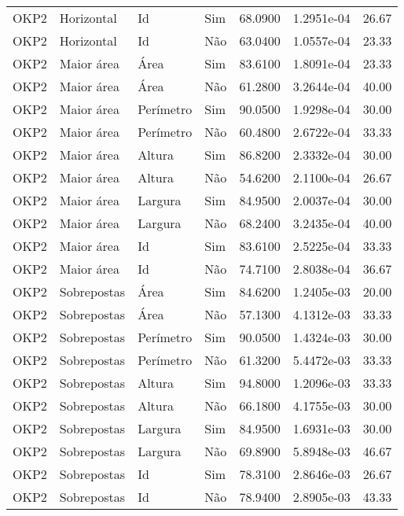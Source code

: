 \begin{tabular}{llllrrr}
    OKP2      & Horizontal  & Id        & Sim         & 68.0900      & 1.2951e-04 & 26.67    \\
    OKP2      & Horizontal  & Id        & Não         & 63.0400      & 1.0557e-04 & 23.33    \\
    OKP2      & Maior área  & Área      & Sim         & 83.6100      & 1.8091e-04 & 23.33    \\
    OKP2      & Maior área  & Área      & Não         & 61.2800      & 3.2644e-04 & 40.00    \\
    OKP2      & Maior área  & Perímetro & Sim         & 90.0500      & 1.9298e-04 & 30.00    \\
    OKP2      & Maior área  & Perímetro & Não         & 60.4800      & 2.6722e-04 & 33.33    \\
    OKP2      & Maior área  & Altura    & Sim         & 86.8200      & 2.3332e-04 & 30.00    \\
    OKP2      & Maior área  & Altura    & Não         & 54.6200      & 2.1100e-04 & 26.67    \\
    OKP2      & Maior área  & Largura   & Sim         & 84.9500      & 2.0037e-04 & 30.00    \\
    OKP2      & Maior área  & Largura   & Não         & 68.2400      & 3.2435e-04 & 40.00    \\
    OKP2      & Maior área  & Id        & Sim         & 83.6100      & 2.5225e-04 & 33.33    \\
    OKP2      & Maior área  & Id        & Não         & 74.7100      & 2.8038e-04 & 36.67    \\
    OKP2      & Sobrepostas & Área      & Sim         & 84.6200      & 1.2405e-03 & 20.00    \\
    OKP2      & Sobrepostas & Área      & Não         & 57.1300      & 4.1312e-03 & 33.33    \\
    OKP2      & Sobrepostas & Perímetro & Sim         & 90.0500      & 1.4324e-03 & 30.00    \\
    OKP2      & Sobrepostas & Perímetro & Não         & 61.3200      & 5.4472e-03 & 33.33    \\
    OKP2      & Sobrepostas & Altura    & Sim         & 94.8000      & 1.2096e-03 & 33.33    \\
    OKP2      & Sobrepostas & Altura    & Não         & 66.1800      & 4.1755e-03 & 30.00    \\
    OKP2      & Sobrepostas & Largura   & Sim         & 84.9500      & 1.6931e-03 & 30.00    \\
    OKP2      & Sobrepostas & Largura   & Não         & 69.8900      & 5.8948e-03 & 46.67    \\
    OKP2      & Sobrepostas & Id        & Sim         & 78.3100      & 2.8646e-03 & 26.67    \\
    OKP2      & Sobrepostas & Id        & Não         & 78.9400      & 2.8905e-03 & 43.33    \\
    \hline
\end{tabular}